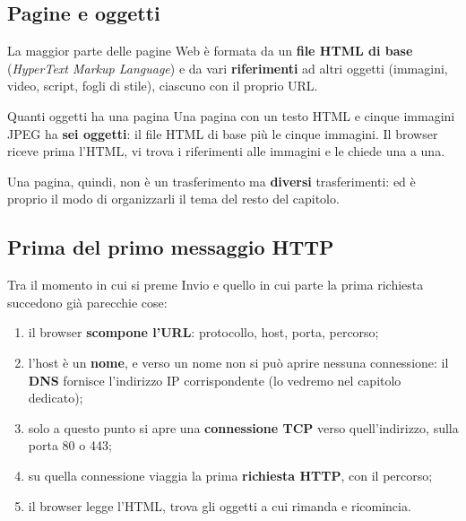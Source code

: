 \subsection{Pagine e oggetti}

La maggior parte delle pagine Web è formata da un \textbf{file HTML di base} (\emph{HyperText Markup
Language}) e da vari \textbf{riferimenti} ad altri oggetti (immagini, video, script, fogli di stile),
ciascuno con il proprio URL.

\begin{esempio}{Quanti oggetti ha una pagina}
Una pagina con un testo HTML e cinque immagini JPEG ha \textbf{sei oggetti}: il file HTML di base più le
cinque immagini. Il browser riceve prima l'HTML, vi trova i riferimenti alle immagini e le chiede una a una.
\end{esempio}

Una pagina, quindi, non è un trasferimento ma \textbf{diversi} trasferimenti: ed è proprio il modo di
organizzarli il tema del resto del capitolo.

\subsection{Prima del primo messaggio HTTP}

Tra il momento in cui si preme Invio e quello in cui parte la prima richiesta succedono già parecchie cose:

\begin{enumerate}
    \item il browser \textbf{scompone l'URL}: protocollo, host, porta, percorso;
    \item l'host è un \textbf{nome}, e verso un nome non si può aprire nessuna connessione: il \textbf{DNS}
          fornisce l'indirizzo IP corrispondente (lo vedremo nel capitolo dedicato);
    \item solo a questo punto si apre una \textbf{connessione TCP} verso quell'indirizzo, sulla porta 80 o 443;
    \item su quella connessione viaggia la prima \textbf{richiesta HTTP}, con il percorso;
    \item il browser legge l'HTML, trova gli oggetti a cui rimanda e ricomincia.
\end{enumerate}


